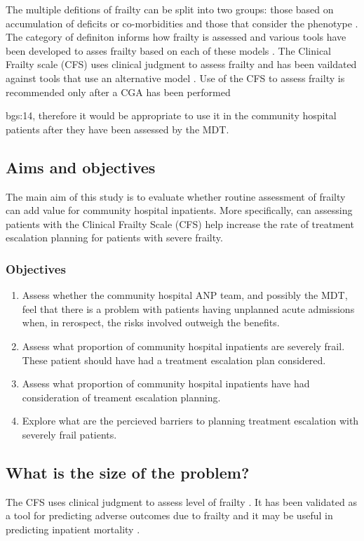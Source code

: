 \documentclass[12pt,a4paper,oneside,titlepage]{article}
\begin{document}
The multiple defitions of frailty can be split into two groups: those based on accumulation 
of deficits or co-morbidities and those that consider the phenotype \parencite{shamliyan:13}. 
The category of definiton informs how frailty is assessed and various tools have been developed
to asses frailty based on each of these models \parencite{clegg:13}.
The Clinical Frailty scale (CFS) uses clinical judgment to assess frailty and has been vaildated
against tools that use an alternative model \parencite{rockwood:05}. Use of the CFS to
assess frailty is recommended only after a CGA has been performed \par{bgs:14}, therefore
it would be appropriate to use it in the community hospital patients after they
have been assessed by the MDT.

\subsection*{Aims and objectives}
The main aim of this study is to evaluate whether routine assessment of
frailty can add value for community hospital inpatients.
More specifically, can assessing patients with the Clinical Frailty Scale (CFS)
help increase the rate of 
treatment escalation planning for patients with severe frailty. 

\subsubsection*{Objectives}
\begin{enumerate}
\item Assess whether the community hospital ANP team, and possibly the MDT, 
feel that there is a  problem with patients 
having unplanned acute admissions when, in rerospect, the risks involved
outweigh the benefits.
\item Assess what proportion of community hospital inpatients are severely frail.
These patient should have had a treatment escalation plan considered.
\item Assess what proportion of community hospital inpatients have had consideration
of treament escalation planning.
\item Explore what are the percieved barriers to planning treatment escalation
with severely frail patients.

\end{enumerate}

\subsection*{What is the size of the problem?}
The CFS uses clinical judgment to assess level of frailty
\parencite{dalhousie:15}. It has been validated as a tool for predicting adverse
outcomes due to frailty \parencite{rockwood:05} and it may be useful in predicting
inpatient mortality \parencite{wallis:15}.
\end{document}
